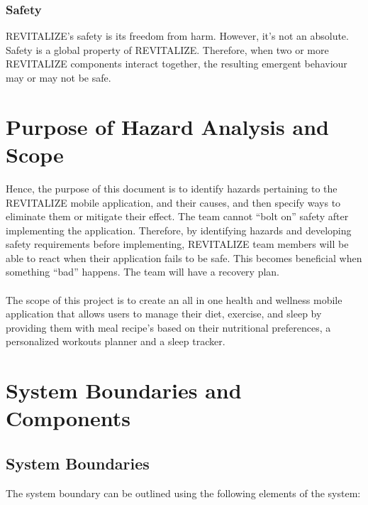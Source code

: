 \documentclass{article}
\begin{document}
\subsubsection{Safety}
REVITALIZE's safety is its freedom from harm. However, it's not an absolute. Safety is a global property of REVITALIZE. Therefore, when two or more REVITALIZE components interact together, the resulting emergent behaviour may or may not be safe.

\section{Purpose of Hazard Analysis and Scope}
Hence, the purpose of this document is to identify hazards pertaining to the REVITALIZE mobile application, and their causes, and then specify ways to eliminate them or mitigate their effect. The team cannot “bolt on” safety after implementing the application. Therefore, by identifying hazards and developing safety requirements before implementing, REVITALIZE team members will be able to react when their application fails to be safe. This becomes beneficial when something “bad” happens. The team will have a recovery plan.
\\\\ The scope of this project is to create an all in one health and wellness mobile application that allows users to manage their diet, exercise, and sleep by providing them with meal recipe’s based on their nutritional preferences, a personalized workouts planner and a sleep tracker.

\section{System Boundaries and Components}

\subsection{System Boundaries}
\noindent The system boundary can be outlined using the following elements of the system: 
\end{document}
